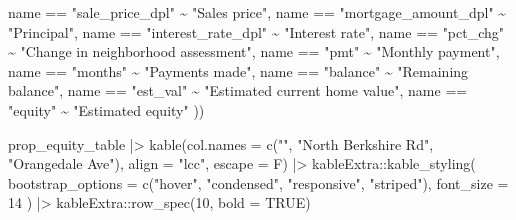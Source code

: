 \documentclass[
  letterpaper,
  DIV=11,
  numbers=noendperiod]{scrartcl}
\newenvironment{Shaded}{\begin{snugshade}}{\end{snugshade}}
\newcommand{\AttributeTok}[1]{\textcolor[rgb]{0.40,0.45,0.13}{#1}}
\newcommand{\ConstantTok}[1]{\textcolor[rgb]{0.56,0.35,0.01}{#1}}
\newcommand{\DecValTok}[1]{\textcolor[rgb]{0.68,0.00,0.00}{#1}}
\newcommand{\FunctionTok}[1]{\textcolor[rgb]{0.28,0.35,0.67}{#1}}
\newcommand{\NormalTok}[1]{\textcolor[rgb]{0.00,0.23,0.31}{#1}}
\newcommand{\SpecialCharTok}[1]{\textcolor[rgb]{0.37,0.37,0.37}{#1}}
\newcommand{\StringTok}[1]{\textcolor[rgb]{0.13,0.47,0.30}{#1}}
\begin{document}
\begin{Shaded}
\begin{Highlighting}[]
\NormalTok{    name }\SpecialCharTok{==} \StringTok{"sale\_price\_dpl"} \SpecialCharTok{\textasciitilde{}} \StringTok{"Sales price"}\NormalTok{,}
\NormalTok{    name }\SpecialCharTok{==} \StringTok{"mortgage\_amount\_dpl"} \SpecialCharTok{\textasciitilde{}} \StringTok{"Principal"}\NormalTok{,}
\NormalTok{    name }\SpecialCharTok{==} \StringTok{"interest\_rate\_dpl"} \SpecialCharTok{\textasciitilde{}} \StringTok{"Interest rate"}\NormalTok{,}
\NormalTok{    name }\SpecialCharTok{==} \StringTok{"pct\_chg"} \SpecialCharTok{\textasciitilde{}} \StringTok{"Change in neighborhood assessment"}\NormalTok{,}
\NormalTok{    name }\SpecialCharTok{==} \StringTok{"pmt"} \SpecialCharTok{\textasciitilde{}} \StringTok{"Monthly payment"}\NormalTok{,}
\NormalTok{    name }\SpecialCharTok{==} \StringTok{"months"} \SpecialCharTok{\textasciitilde{}} \StringTok{"Payments made"}\NormalTok{,}
\NormalTok{    name }\SpecialCharTok{==} \StringTok{"balance"} \SpecialCharTok{\textasciitilde{}} \StringTok{"Remaining balance"}\NormalTok{,}
\NormalTok{    name }\SpecialCharTok{==} \StringTok{"est\_val"} \SpecialCharTok{\textasciitilde{}} \StringTok{"Estimated current home value"}\NormalTok{,}
\NormalTok{    name }\SpecialCharTok{==} \StringTok{"equity"} \SpecialCharTok{\textasciitilde{}} \StringTok{"Estimated equity"}
\NormalTok{  ))}
  
\NormalTok{prop\_equity\_table }\SpecialCharTok{|\textgreater{}} 
  \FunctionTok{kable}\NormalTok{(}\AttributeTok{col.names =} \FunctionTok{c}\NormalTok{(}\StringTok{""}\NormalTok{, }\StringTok{"North Berkshire Rd"}\NormalTok{, }\StringTok{"Orangedale Ave"}\NormalTok{),}
        \AttributeTok{align =} \StringTok{"lcc"}\NormalTok{,}
        \AttributeTok{escape =}\NormalTok{ F) }\SpecialCharTok{|\textgreater{}} 
\NormalTok{  kableExtra}\SpecialCharTok{::}\FunctionTok{kable\_styling}\NormalTok{(}
   \AttributeTok{bootstrap\_options =} \FunctionTok{c}\NormalTok{(}\StringTok{"hover"}\NormalTok{, }\StringTok{"condensed"}\NormalTok{, }\StringTok{"responsive"}\NormalTok{, }\StringTok{"striped"}\NormalTok{),}
   \AttributeTok{font\_size =} \DecValTok{14}
\NormalTok{  ) }\SpecialCharTok{|\textgreater{}} 
\NormalTok{  kableExtra}\SpecialCharTok{::}\FunctionTok{row\_spec}\NormalTok{(}\DecValTok{10}\NormalTok{, }\AttributeTok{bold =} \ConstantTok{TRUE}\NormalTok{)}
\end{Highlighting}
\end{Shaded}
\end{document}
